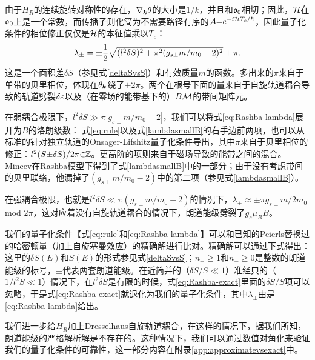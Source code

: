 由于$H_R$的连续旋转对称性的存在，$\nabla_{\boldsymbol{k}} \theta$的大小是$1/k$，并且和$\mathfrak{o}_0$相切；因此，${\cal H}$在$\mathfrak{o}_0$上是一个常数，而传播子则化简为不需要路径有序的${\cal A}{=}e^{{-}i{\cal H} T_c/\hbar}$，因此量子化条件的相位修正仅仅是${\cal H}$的本征值乘以$T_c$：
\begin{equation}
\lambda_{\pm}=\pm\frac{1}{2}\sqrt{({l^2\delta S})^2+\pi^2(g_{s\perp}m/m_0-2)^2}+\pi. \label{eq:Rashba-lambda}
\end{equation}
这是一个面积差$\delta S$（参见式\ref{deltaSvsS}）和有效质量$m$的函数。多出来的$\pi$来自于单带的贝里相位，体现在$\theta_{\boldsymbol{k}}$绕了${\pm}2\pi$。两个在根号下面的量来自于自旋轨道耦合导致的轨道劈裂$\delta \varepsilon$以及（在零场的能带基下的）$B{\cal M}$的带间矩阵元。

在弱耦合极限下，$l^2\delta S \gg \pi|g_{s\perp} m/m_0{-}2|$，我们可以将式\ref{eq:Rashba-lambda}展开为$B$的洛朗级数：
式\ref{eq:rule}以及式\ref{lambdasmallB}的右手边前两项，也可以从标准的针对独立轨道的Onsager-Lifshitz量子化条件导出，其中$\pi$来自于贝里相位的修正：$l^2(S{\pm}\delta S)/2\pi {\in}\mathbb{Z}$。更高阶的项则来自于磁场导致的能带之间的混合。Mineev在Rashba模型下得到了式\ref{lambdasmallB}中的一部分\cite{mineev_haas--van_2005}；由于没有考虑带间的贝里联络，他漏掉了$(g_{s\perp}m/m_0-2)$中的第二项（参见式\ref{lambdasmallB}）。

在强耦合极限，也就是$l^2\delta S {\ll}\pi(g_{s\perp}m/m_0{-}2)$的情况下，$\lambda_{\pm}{\approx}{\pm}\pi g_{s\perp}m/2m_0$ mod $2\pi$，这对应着没有自旋轨道耦合的情况下，朗道能级劈裂了$g_{s}\mu_BB$。

我们的量子化条件【式\ref{eq:rule}和\ref{eq:Rashba-lambda}】可以和已知的Peierls替换过的哈密顿量（加上自旋塞曼效应）的精确解进行比对。精确解\cite{bychkov_oscillatory_1984}可以通过下式得出：
这里的$\delta S(E)$和$S(E)$的形式参见式\ref{deltaSvsS}；$n_{+}{\ge} 1$和$n_-{\ge} 0$是整数的朗道能级的标号，$\pm$代表两套朗道能级。在近简并的（$\delta S/S\ll 1$）准经典的（$1/l^2S \ll 1$）情况下，在$l^2\delta S$是有限的时候，式\ref{eq:Rashba-exact}里面的$\delta S/S$项可以忽略，于是式\ref{eq:Rashba-exact}就退化为我们的量子化条件，其中$\lambda_{\pm}$由是\ref{eq:Rashba-lambda}给出。


我们进一步给$H_R$加上Dresselhaus自旋轨道耦合，在这样的情况下，据我们所知，朗道能级的严格解析解是不存在的。这种情况下，我们可以通过数值对角化来验证我们的量子化条件的可靠性，这一部分内容在附录\ref{app:approximatevsexact}中。


